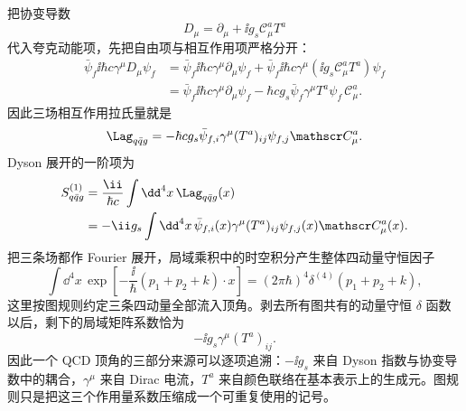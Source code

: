 \begin{derivation}[夸克与胶子的相互作用顶角]
把协变导数
\[
D_\mu=\partial_\mu+\ii g_s\mathscr C_\mu^aT^a
\]
代入夸克动能项，先把自由项与相互作用项严格分开：
\begin{align*}
\bar\psi_f\ii\hbar c\gamma^\mu D_\mu\psi_f
&=\bar\psi_f\ii\hbar c\gamma^\mu\partial_\mu\psi_f
+\bar\psi_f\ii\hbar c\gamma^\mu
(\ii g_s\mathscr C_\mu^aT^a)\psi_f\\
&=\bar\psi_f\ii\hbar c\gamma^\mu\partial_\mu\psi_f
-\hbar c g_s\bar\psi_f\gamma^\mu T^a\psi_f\,\mathscr C_\mu^a.
\end{align*}
因此三场相互作用拉氏量就是
\[
\Lag_{q\bar q g}
=-\hbar c g_s\bar\psi_{f,i}\gamma^\mu(T^a)_{ij}\psi_{f,j}\mathscr C_\mu^a.
\]
Dyson 展开的一阶项为
\begin{align*}
S_{q\bar q g}^{(1)}
&=\frac{\ii}{\hbar c}\int\dd^4x\,\Lag_{q\bar q g}(x)\\
&=-\ii g_s\int\dd^4x\,
\bar\psi_{f,i}(x)\gamma^\mu(T^a)_{ij}\psi_{f,j}(x)\mathscr C_\mu^a(x).
\end{align*}
把三条场都作 Fourier 展开，局域乘积中的时空积分产生整体四动量守恒因子
\[
\int\dd^4x\,
\exp\!\left[-\frac{\ii}{\hbar}
(p_1+p_2+k)\cdot x\right]
=(2\pi\hbar)^4\delta^{(4)}(p_1+p_2+k),
\]
这里按图规则约定三条四动量全部流入顶角。剥去所有图共有的动量守恒 $\delta$ 函数以后，剩下的局域矩阵系数恰为
\[
\boxed{-\ii g_s\gamma^\mu(T^a)_{ij}}.
\]
因此一个 QCD 顶角的三部分来源可以逐项追溯：$-\ii g_s$ 来自 Dyson 指数与协变导数中的耦合，$\gamma^\mu$ 来自 Dirac 电流，$T^a$ 来自颜色联络在基本表示上的生成元。图规则只是把这三个作用量系数压缩成一个可重复使用的记号。
\end{derivation}

